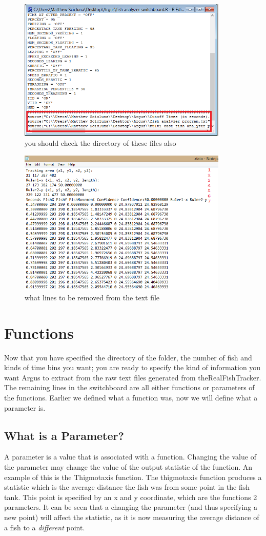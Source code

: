 \documentclass[12pt,titlepage]{report}
\begin{document}
\begin{figure}[ht!]
\centering
\includegraphics[width=100mm]{image3.png}
\caption{you should check the directory of these files also}
\label{overflow}
\end{figure}

\begin{figure}[ht!]
\centering
\includegraphics[width=100mm]{image8.png}
\caption{what lines to be removed from the text file}
\label{overflow}
\end{figure}

\chapter{Functions}
Now that you have specified the directory of the folder, the number of fish and kinds of time bins you want; you are ready to specify the kind of information you want Argus to extract from the raw text files generated from theRealFishTracker. The remaining lines in the switchboard are all either functions or parameters of the functions. Earlier we defined what a function was, now we will define what a parameter is.
\section{What is a Parameter?}
A parameter is a value that is associated with a function. Changing the value of the parameter may change the value of the output statistic of the function. An example of this is the Thigmotaxis function. The thigmotaxis function produces a statistic which is the average distance the fish was from some point in the fish tank. This point is specified by an x and y coordinate, which are the functions 2 parameters. It can be seen that a changing the parameter (and thus specifying a new point) will affect the statistic, as it is now measuring the average distance of a fish to a \emph{different} point. 
\end{document}
